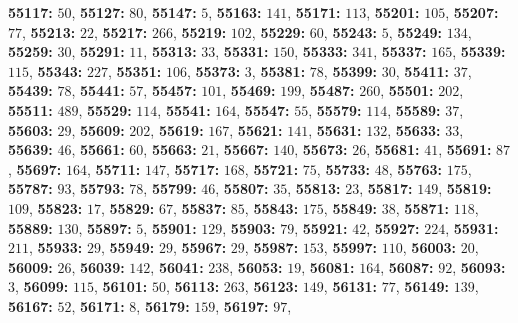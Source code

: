 \textsf{\bfseries 55117:} $50$, \textsf{\bfseries 55127:} $80$, \textsf{\bfseries 55147:} $5$, \textsf{\bfseries 55163:} $141$, \textsf{\bfseries 55171:} $113$, \textsf{\bfseries 55201:} $105$, \textsf{\bfseries 55207:} $77$, \textsf{\bfseries 55213:} $22$, \textsf{\bfseries 55217:} $266$, \textsf{\bfseries 55219:} $102$, \textsf{\bfseries 55229:} $60$, \textsf{\bfseries 55243:} $5$, \textsf{\bfseries 55249:} $134$, \textsf{\bfseries 55259:} $30$, \textsf{\bfseries 55291:} $11$, \textsf{\bfseries 55313:} $33$, \textsf{\bfseries 55331:} $150$, \textsf{\bfseries 55333:} $341$, \textsf{\bfseries 55337:} $165$, \textsf{\bfseries 55339:} $115$, \textsf{\bfseries 55343:} $227$, \textsf{\bfseries 55351:} $106$, \textsf{\bfseries 55373:} $3$, \textsf{\bfseries 55381:} $78$, \textsf{\bfseries 55399:} $30$, \textsf{\bfseries 55411:} $37$, \textsf{\bfseries 55439:} $78$, \textsf{\bfseries 55441:} $57$, \textsf{\bfseries 55457:} $101$, \textsf{\bfseries 55469:} $199$, \textsf{\bfseries 55487:} $260$, \textsf{\bfseries 55501:} $202$, \textsf{\bfseries 55511:} $489$, \textsf{\bfseries 55529:} $114$, \textsf{\bfseries 55541:} $164$, \textsf{\bfseries 55547:} $55$, \textsf{\bfseries 55579:} $114$, \textsf{\bfseries 55589:} $37$, \textsf{\bfseries 55603:} $29$, \textsf{\bfseries 55609:} $202$, \textsf{\bfseries 55619:} $167$, \textsf{\bfseries 55621:} $141$, \textsf{\bfseries 55631:} $132$, \textsf{\bfseries 55633:} $33$, \textsf{\bfseries 55639:} $46$, \textsf{\bfseries 55661:} $60$, \textsf{\bfseries 55663:} $21$, \textsf{\bfseries 55667:} $140$, \textsf{\bfseries 55673:} $26$, \textsf{\bfseries 55681:} $41$, \textsf{\bfseries 55691:} $87$, \textsf{\bfseries 55697:} $164$, \textsf{\bfseries 55711:} $147$, \textsf{\bfseries 55717:} $168$, \textsf{\bfseries 55721:} $75$, \textsf{\bfseries 55733:} $48$, \textsf{\bfseries 55763:} $175$, \textsf{\bfseries 55787:} $93$, \textsf{\bfseries 55793:} $78$, \textsf{\bfseries 55799:} $46$, \textsf{\bfseries 55807:} $35$, \textsf{\bfseries 55813:} $23$, \textsf{\bfseries 55817:} $149$, \textsf{\bfseries 55819:} $109$, \textsf{\bfseries 55823:} $17$, \textsf{\bfseries 55829:} $67$, \textsf{\bfseries 55837:} $85$, \textsf{\bfseries 55843:} $175$, \textsf{\bfseries 55849:} $38$, \textsf{\bfseries 55871:} $118$, \textsf{\bfseries 55889:} $130$, \textsf{\bfseries 55897:} $5$, \textsf{\bfseries 55901:} $129$, \textsf{\bfseries 55903:} $79$, \textsf{\bfseries 55921:} $42$, \textsf{\bfseries 55927:} $224$, \textsf{\bfseries 55931:} $211$, \textsf{\bfseries 55933:} $29$, \textsf{\bfseries 55949:} $29$, \textsf{\bfseries 55967:} $29$, \textsf{\bfseries 55987:} $153$, \textsf{\bfseries 55997:} $110$, \textsf{\bfseries 56003:} $20$, \textsf{\bfseries 56009:} $26$, \textsf{\bfseries 56039:} $142$, \textsf{\bfseries 56041:} $238$, \textsf{\bfseries 56053:} $19$, \textsf{\bfseries 56081:} $164$, \textsf{\bfseries 56087:} $92$, \textsf{\bfseries 56093:} $3$, \textsf{\bfseries 56099:} $115$, \textsf{\bfseries 56101:} $50$, \textsf{\bfseries 56113:} $263$, \textsf{\bfseries 56123:} $149$, \textsf{\bfseries 56131:} $77$, \textsf{\bfseries 56149:} $139$, \textsf{\bfseries 56167:} $52$, \textsf{\bfseries 56171:} $8$, \textsf{\bfseries 56179:} $159$, \textsf{\bfseries 56197:} $97$, 
